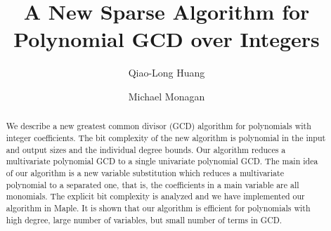 \documentclass[final,20pt]{elsarticle}
\begin{document}
\begin{frontmatter}



\title{A New Sparse Algorithm for Polynomial GCD over Integers}

\author[firstaddress]{Qiao-Long Huang}

\author[secondaddress]{Michael Monagan}

\address[firstaddress]{School of Mathematics, Shandong University, Jinan, {\rm250100}, China}
\address[secondaddress]{Department of Mathematics, Simon Fraser University, Burnaby, British Columbia, V5A 1S6, Canada}



\begin{abstract}
We describe a new greatest common divisor (GCD) algorithm for polynomials with integer coefficients.
%
The bit complexity of the new algorithm is polynomial in the input and
output sizes and the individual degree bounds.
%
 Our algorithm reduces a multivariate polynomial GCD to a single univariate polynomial GCD.
%
The main idea of our algorithm is a new variable
substitution which reduces a multivariate polynomial to
a separated one, that is, the coefficients in a main variable are all monomials. The explicit bit complexity is analyzed and we have implemented our algorithm in Maple. It is shown that our algorithm is
efficient for polynomials with high degree, large number of variables, but small number of terms in GCD.
\end{abstract}


\end{frontmatter}
\end{document}
